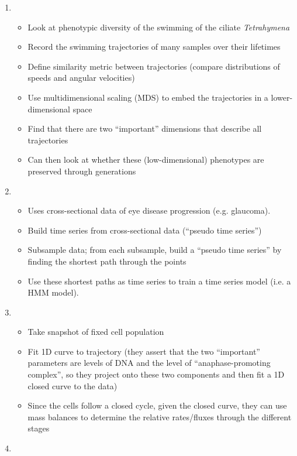 \documentclass[12pt]{article}
\begin{document}
\begin{enumerate}
\item {}
\begin{itemize}
	\item Look at phenotypic diversity of the swimming of the ciliate {\em Tetrahymena}
	\item Record the swimming trajectories of many samples over their lifetimes
	\item Define similarity metric between trajectories (compare distributions of speeds and angular velocities)
	\item Use multidimensional scaling (MDS) to embed the trajectories in a lower-dimensional space
	\item Find that there are two ``important'' dimensions that describe all trajectories
	\item Can then look at whether these (low-dimensional) phenotypes are preserved through generations
\end{itemize}

\item {}
\begin{itemize}
	\item Uses cross-sectional data of eye disease progression (e.g. glaucoma).
	\item Build time series from cross-sectional data (``pseudo time series'')
	\item Subsample data; from each subsample, build a ``pseudo time series'' by finding the shortest path through the points
	\item Use these shortest paths as time series to train a time series model (i.e. a HMM model).
\end{itemize}

\item {}
\begin{itemize}
	\item Take snapshot of fixed cell population
	\item Fit 1D curve to trajectory (they assert that the two ``important'' parameters are levels of DNA and the level of ``anaphase-promoting complex'', so they project onto these two components and then fit a 1D closed curve to the data)
	\item Since the cells follow a closed cycle, given the closed curve, they can use mass balances to determine the relative rates/fluxes through the different stages
\end{itemize}

\item {}


\end{enumerate}
\end{document}
